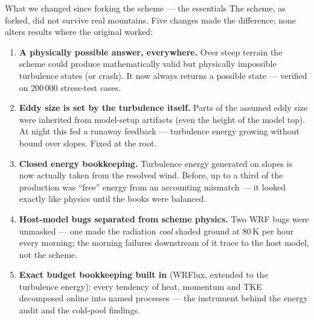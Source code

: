 \documentclass[10pt,aspectratio=169]{beamer}
\begin{document}
\begin{frame}{What we changed since forking the scheme --- the essentials}
  The scheme, as forked, did not survive real mountains. Five changes made
  the difference; none alters results where the original worked:
  \begin{enumerate}\small
    \item \textbf{A physically possible answer, everywhere.} Over steep
      terrain the scheme could produce mathematically valid but physically
      impossible turbulence states (or crash). It now always returns a
      possible state --- verified on 200\,000 stress-test cases.
    \item \textbf{Eddy size is set by the turbulence itself.} Parts of the
      assumed eddy size were inherited from model-setup artifacts (even the
      height of the model top). At night this fed a runaway feedback ---
      turbulence energy growing without bound over slopes. Fixed at the root.
    \item \textbf{Closed energy bookkeeping.} Turbulence energy generated on
      slopes is now actually taken from the resolved wind. Before, up to a
      third of the production was ``free'' energy from an accounting
      mismatch --- it looked exactly like physics until the books were
      balanced.
    \item \textbf{Host-model bugs separated from scheme physics.} Two WRF
      bugs were unmasked --- one made the radiation \emph{cool} shaded ground
      at 80\,K per hour every morning; the morning failures downstream of it
      trace to the host model, not the scheme.
    \item \textbf{Exact budget bookkeeping built in} (WRFlux, extended to the
      turbulence energy): every tendency of heat, momentum and TKE decomposed
      online into named processes --- the instrument behind the energy audit
      and the cold-pool findings.
  \end{enumerate}
\end{frame}
\end{document}
